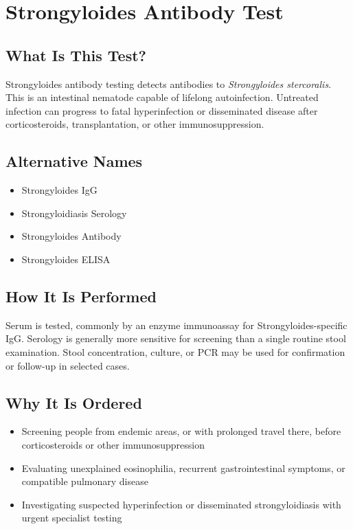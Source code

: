 \chapter{Strongyloides Antibody Test}

\section*{What Is This Test?}
Strongyloides antibody testing detects antibodies to \textit{Strongyloides stercoralis}. This is an intestinal nematode capable of lifelong autoinfection. Untreated infection can progress to fatal hyperinfection or disseminated disease after corticosteroids, transplantation, or other immunosuppression.

\section*{Alternative Names}
\begin{itemize}
  \item Strongyloides IgG
  \item Strongyloidiasis Serology
  \item Strongyloides Antibody
  \item Strongyloides ELISA
\end{itemize}
\section*{How It Is Performed}
Serum is tested, commonly by an enzyme immunoassay for Strongyloides-specific IgG. Serology is generally more sensitive for screening than a single routine stool examination. Stool concentration, culture, or PCR may be used for confirmation or follow-up in selected cases.

\section*{Why It Is Ordered}
\begin{itemize}
  \item Screening people from endemic areas, or with prolonged travel there, before corticosteroids or other immunosuppression
  \item Evaluating unexplained eosinophilia, recurrent gastrointestinal symptoms, or compatible pulmonary disease
  \item Investigating suspected hyperinfection or disseminated strongyloidiasis with urgent specialist testing
\end{itemize}

